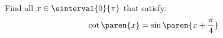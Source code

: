 Find all $x \in \ointerval{0}{\pi}$ that satisfy:
\begin{equation*}
  \cot\paren{x} = \sin\paren{x + \frac{\pi}{4}}
\end{equation*}
